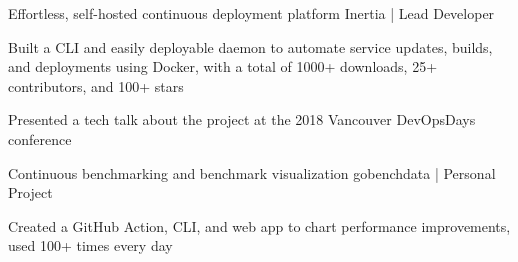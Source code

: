  {\scshape{}}
\begin{cventries}

  \cventry
    {Effortless, self-hosted continuous deployment platform} %
    {Inertia | Lead Developer} %
    {} %
    {} %
    {
      \begin{cvitems} %
        \item {Built a CLI and easily deployable daemon to automate service updates, builds, and deployments using Docker, with a total of 1000+ downloads, 25+ contributors, and 100+ stars}
        \item {Presented a tech talk about the project at the 2018 Vancouver DevOpsDays conference}
      \end{cvitems}
    }
  \cventry
    {Continuous benchmarking and benchmark visualization} %
    {gobenchdata | Personal Project} %
    {} %
    {} %
    {
      \begin{cvitems} %
        \item {Created a GitHub Action, CLI, and web app to chart performance improvements, used 100+ times every day}
      \end{cvitems}
    }

\end{cventries}
